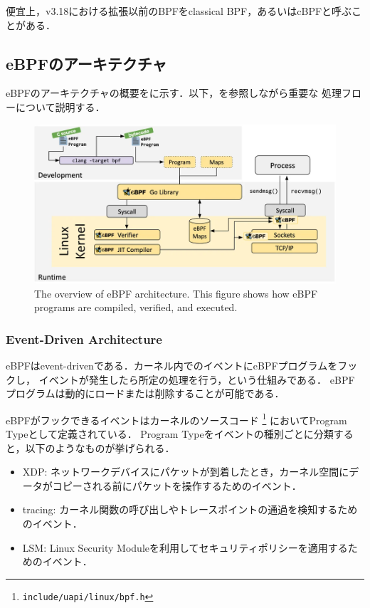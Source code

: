 便宜上，v3.18における拡張以前のBPFをclassical BPF，あるいはcBPFと呼ぶことがある．

\subsection{eBPFのアーキテクチャ}
eBPFのアーキテクチャの概要をに示す．以下，を参照しながら重要な
処理フローについて説明する．
\begin{figure}[tp]
  \begin{center}
    \includegraphics[width=\columnwidth]{./img/ebpf_system.png}
  \end{center}
  \caption{The overview of eBPF architecture. This figure shows how eBPF programs are compiled, verified, and executed.
    \cite{WhatiseB29:online}}
  \label{img:ebpf-system}
\end{figure}

\subsubsection{Event-Driven Architecture}
eBPFはevent-drivenである．カーネル内でのイベントにeBPFプログラムをフックし，
イベントが発生したら所定の処理を行う，という仕組みである．
eBPFプログラムは動的にロードまたは削除することが可能である．

eBPFがフックできるイベントはカーネルのソースコード \footnote{\texttt{include/uapi/linux/bpf.h}} においてProgram Typeとして定義されている．
Program Typeをイベントの種別ごとに分類すると，以下のようなものが挙げられる．
\begin{itemize}
  \item XDP: ネットワークデバイスにパケットが到着したとき，カーネル空間にデータがコピーされる前にパケットを操作するためのイベント．
  \item tracing: カーネル関数の呼び出しやトレースポイントの通過を検知するためのイベント．
  \item LSM: Linux Security Moduleを利用してセキュリティポリシーを適用するためのイベント．
\end{itemize}

